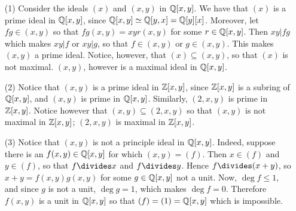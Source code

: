 \begin{example}\label{label_7.3}
\begin{enumerate}
\item[(1)] Consider the ideals $(x)$ and $(x,y)$ in $\mathbb{Q}[x,y]$. We have
that $(x)$ is a prime ideal in $\mathbb{Q}[x,y]$, since $\mathbb{Q}[x,y] \simeq
\mathbb{Q}[y,x]=\mathbb{Q}[y][x]$. Moreover, let $fg \in (x,y)$ so that
$fg(x,y)=xyr(x,y)$ for some $r \in \mathbb{Q}[x,y]$. Then $xy|fg$ which
makes  $xy|f$ or  $xy|g$, so that $f \in (x,y)$ or $g \in (x,y)$.
This makes $(x,y)$ a prime ideal. Notice, however, that $(x)
\subseteq (x,y)$, so that $(x)$ is not maximal. $(x,y)$, however is
a maximal ideal in $\mathbb{Q}[x,y]$.

\item[(2)] Notice that $(x,y)$ is a prime ideal in $\mathbb{Z}[x,y]$, since
$\mathbb{Z}[x,y]$ is a subring of $\mathbb{Q}[x,y]$, and $(x,y)$ is prime in
$\mathbb{Q}[x,y]$. Similarly, $(2,x,y)$ is prime in $\mathbb{Z}[x,y]$. Notice
however that $(x,y) \subseteq (2,x,y)$ so that $(x,y)$ is not
maximal in $\mathbb{Z}[x,y]$; $(2,x,y)$ is maximal in $\mathbb{Z}[x,y]$.

\item[(3)] Notice that $(x,y)$ is not a principle ideal in $\mathbb{Q}[x,y]$.
  Indeed, suppose there is an $f(x,y) \in \mathbb{Q}[x,y]$ for which
  $(x,y)=(f)$. Then $x \in (f)$ and $y \in (f)$, so that $f \divides
  x$ and  $f \divides y$. Hence $f \divides (x+y)$, so
  $x+y=f(x,y)g(x,y)$ for some $g \in \mathbb{Q}[x,y]$ not a unit. Now,
  $\deg{f} \leq 1$, and since $g$ is not a unit, $\deg{g}=1$, which
  makes $\deg{f}=0$. Therefore $f(x,y)$ is a unit in $\mathbb{Q}[x,y]$ so that
  $(f)=(1)=\mathbb{Q}[x,y]$ which is impossible.
\end{enumerate}
\end{example}
